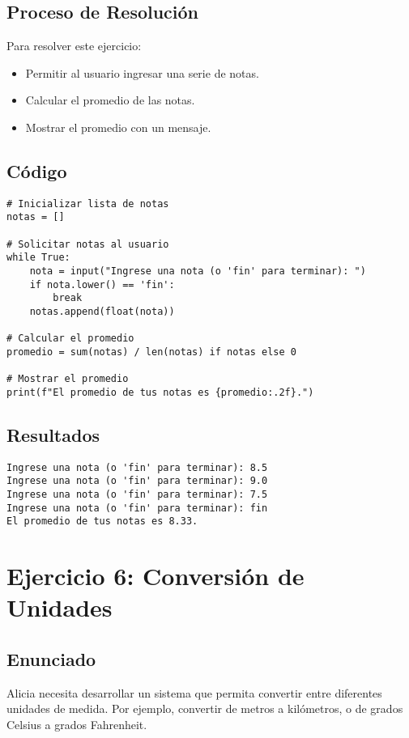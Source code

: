 \documentclass[a4paper,12pt]{article}
\begin{document}
\subsection{Proceso de Resolución}
Para resolver este ejercicio:
\begin{itemize}
    \item Permitir al usuario ingresar una serie de notas.
    \item Calcular el promedio de las notas.
    \item Mostrar el promedio con un mensaje.
\end{itemize}

\subsection{Código}
\begin{lstlisting}
# Inicializar lista de notas
notas = []

# Solicitar notas al usuario
while True:
    nota = input("Ingrese una nota (o 'fin' para terminar): ")
    if nota.lower() == 'fin':
        break
    notas.append(float(nota))

# Calcular el promedio
promedio = sum(notas) / len(notas) if notas else 0

# Mostrar el promedio
print(f"El promedio de tus notas es {promedio:.2f}.")
\end{lstlisting}

\subsection{Resultados}
\begin{verbatim}
Ingrese una nota (o 'fin' para terminar): 8.5
Ingrese una nota (o 'fin' para terminar): 9.0
Ingrese una nota (o 'fin' para terminar): 7.5
Ingrese una nota (o 'fin' para terminar): fin
El promedio de tus notas es 8.33.
\end{verbatim}

\newpage
\section{Ejercicio 6: Conversión de Unidades}

\subsection{Enunciado}
Alicia necesita desarrollar un sistema que permita convertir entre diferentes unidades de medida. Por ejemplo, convertir de metros a kilómetros, o de grados Celsius a grados Fahrenheit.
\end{document}
